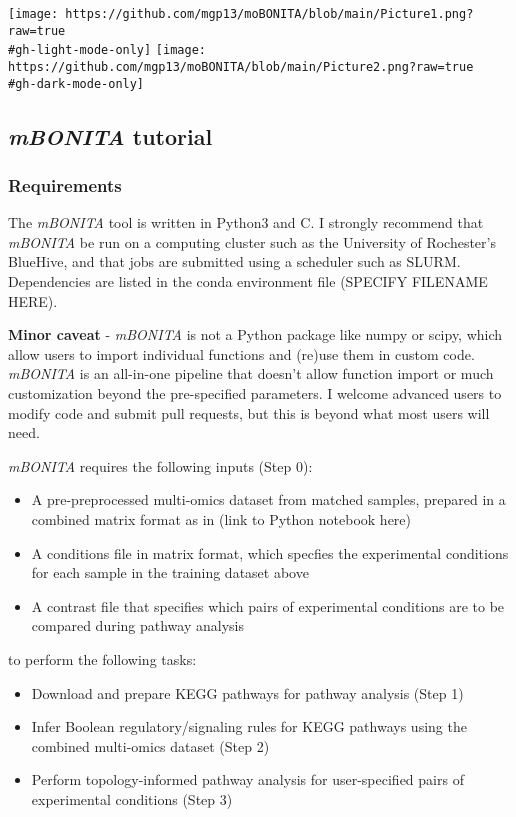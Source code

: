 \documentclass[]{article}
\providecommand{\tightlist}{%
  \setlength{\itemsep}{0pt}\setlength{\parskip}{0pt}}
\begin{document}
\texttt{[image: https://github.com/mgp13/moBONITA/blob/main/Picture1.png?raw=true\\\#gh-light-mode-only]}
\texttt{[image: https://github.com/mgp13/moBONITA/blob/main/Picture2.png?raw=true\\\#gh-dark-mode-only]}

\hypertarget{mbonita-tutorial}{%
\subsection{\texorpdfstring{\emph{mBONITA}
tutorial}{mBONITA tutorial}}\label{mbonita-tutorial}}

\hypertarget{requirements}{%
\subsubsection{Requirements}\label{requirements}}

The \emph{mBONITA} tool is written in Python3 and C. I strongly
recommend that \emph{mBONITA} be run on a computing cluster such as the
University of Rochester's BlueHive, and that jobs are submitted using a
scheduler such as SLURM. Dependencies are listed in the conda
environment file (SPECIFY FILENAME HERE).

\textbf{Minor caveat} - \emph{mBONITA} is not a Python package like
numpy or scipy, which allow users to import individual functions and
(re)use them in custom code. \emph{mBONITA} is an all-in-one pipeline
that doesn't allow function import or much customization beyond the
pre-specified parameters. I welcome advanced users to modify code and
submit pull requests, but this is beyond what most users will need.

\emph{mBONITA} requires the following inputs (Step 0):

\begin{itemize}
\tightlist
\item
  A pre-preprocessed multi-omics dataset from matched samples, prepared
  in a combined matrix format as in (link to Python notebook here)
\item
  A conditions file in matrix format, which specfies the experimental
  conditions for each sample in the training dataset above
\item
  A contrast file that specifies which pairs of experimental conditions
  are to be compared during pathway analysis
\end{itemize}

to perform the following tasks:

\begin{itemize}
\tightlist
\item
  Download and prepare KEGG pathways for pathway analysis (Step 1)
\item
  Infer Boolean regulatory/signaling rules for KEGG pathways using the
  combined multi-omics dataset (Step 2)
\item
  Perform topology-informed pathway analysis for user-specified pairs of
  experimental conditions (Step 3)
\end{itemize}
\end{document}
